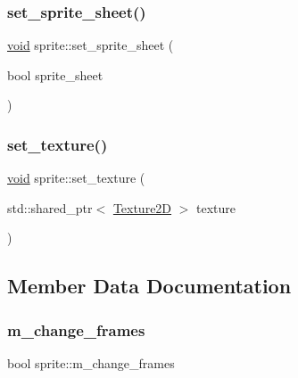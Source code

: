 \mbox{\label{classsprite_aba784f0507715f2e5a9c9eec4c84c868}} 
\subsubsection{\texorpdfstring{set\+\_\+sprite\+\_\+sheet()}{set\_sprite\_sheet()}}
{\footnotesize\ttfamily \hyperlink{imgui__impl__opengl3__loader_8h_ac668e7cffd9e2e9cfee428b9b2f34fa7}{void} sprite\+::set\+\_\+sprite\+\_\+sheet (\begin{DoxyParamCaption}\item[{bool}]{sprite\+\_\+sheet }\end{DoxyParamCaption})\hspace{0.3cm}{\ttfamily [inline]}}

\mbox{\label{classsprite_a9923b8aa539e4a415a105df2e5ef723e}} 
\subsubsection{\texorpdfstring{set\+\_\+texture()}{set\_texture()}}
{\footnotesize\ttfamily \hyperlink{imgui__impl__opengl3__loader_8h_ac668e7cffd9e2e9cfee428b9b2f34fa7}{void} sprite\+::set\+\_\+texture (\begin{DoxyParamCaption}\item[{std\+::shared\+\_\+ptr$<$ \hyperlink{classTexture2D}{Texture2D} $>$}]{texture }\end{DoxyParamCaption})\hspace{0.3cm}{\ttfamily [inline]}}



\subsection{Member Data Documentation}
\mbox{\label{classsprite_a29b0927a7303c9156b9caf753501db06}} 
\subsubsection{\texorpdfstring{m\+\_\+change\+\_\+frames}{m\_change\_frames}}
{\footnotesize\ttfamily bool sprite\+::m\+\_\+change\+\_\+frames\hspace{0.3cm}{\ttfamily [private]}}

